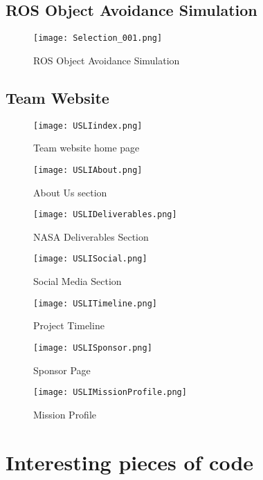 \documentclass[onecolumn, draftclsnofoot,10pt, compsoc]{IEEEtran}
\begin{document}
\subsection{ROS Object Avoidance Simulation}
\begin{figure}[H]
	\centering
	\texttt{[image: Selection\_001.png]}
	\caption{ROS Object Avoidance Simulation}
    \label{figure:ROS Object Avoidance Simulation}
\end{figure}
\subsection{Team Website}
\begin{figure}[H]
	\centering
	\texttt{[image: USLIindex.png]}
	\caption{Team website home page}
    \label{figure:Team website home page}
\end{figure}
\begin{figure}[H]
	\centering
	\texttt{[image: USLIAbout.png]}
	\caption{About Us section}
    \label{figure:About Us Section}
\end{figure}
\begin{figure}[H]
	\centering
	\texttt{[image: USLIDeliverables.png]}
	\caption{NASA Deliverables Section}
    \label{NASA Deliverables section}
\end{figure}
\begin{figure}[H]
	\centering
	\texttt{[image: USLISocial.png]}
	\caption{Social Media Section}
    \label{figure:Social Media Section}
\end{figure}
\begin{figure}[H]
	\centering
	\texttt{[image: USLITimeline.png]}
	\caption{Project Timeline}
    \label{figure:Project Timeline}
\end{figure}
\begin{figure}[H]
	\centering
	\texttt{[image: USLISponsor.png]}
	\caption{Sponsor Page}
    \label{figure:Sponsor Page}
\end{figure}
\begin{figure}[H]
	\centering
	\texttt{[image: USLIMissionProfile.png]}
	\caption{Mission Profile}
    \label{figure:Mission Profile}
\end{figure}
\section{Interesting pieces of code}
\end{document}
